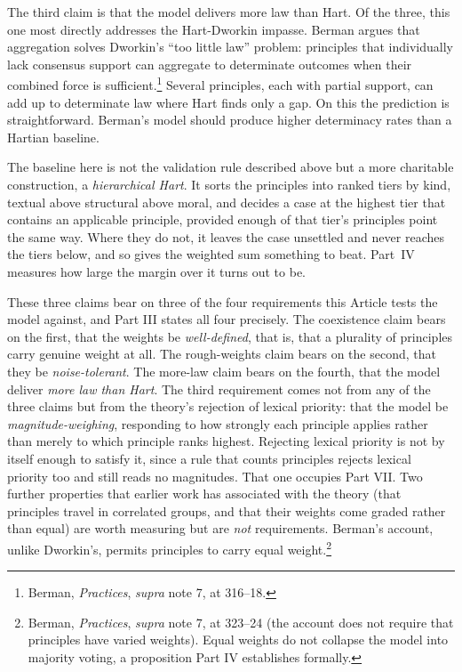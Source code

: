 The third claim is that the model delivers more law than Hart. Of the three, this one most directly addresses the Hart-Dworkin impasse. Berman
argues that aggregation solves Dworkin's ``too little law'' problem:
principles that individually lack consensus support can aggregate to
determinate outcomes when their combined force is sufficient.\footnote{Berman, \textit{Practices}, \textit{supra} note 7, at 316--18.} Several principles, each with partial
support, can add up to determinate law where Hart finds only a gap. On this the prediction is straightforward. Berman's model should produce
higher determinacy rates than a Hartian baseline.

The baseline here is not the validation rule described above but a more
charitable construction, a \textit{hierarchical Hart}. It sorts the
principles into ranked tiers by kind, textual above structural above moral,
and decides a case at the highest tier that contains an applicable principle,
provided enough of that tier's principles point the same way. Where they do
not, it leaves the case unsettled and never reaches the tiers below, and so
gives the weighted sum something to beat. Part~IV measures how large the
margin over it turns out to be.

These three claims bear on three of the four requirements this Article tests
the model against, and Part III states all four precisely. The
coexistence claim bears on the first, that the weights be
\textit{well-defined}, that is, that a plurality of principles carry
genuine weight at all. The rough-weights claim bears on the second, that they
be \textit{noise-tolerant}. The more-law claim bears on the fourth, that the
model deliver \textit{more law than Hart}. The third requirement comes not
from any of the three claims but from the theory's rejection of lexical
priority: that the model be \textit{magnitude-weighing}, responding to how
strongly each principle applies rather than merely to which principle ranks
highest. Rejecting lexical priority is not by itself enough to satisfy it,
since a rule that counts principles rejects lexical priority too and still
reads no magnitudes. That one occupies Part VII. Two further properties that earlier work has
associated with the theory (that principles travel in correlated groups,
and that their weights come graded rather than equal) are worth measuring
but are \textit{not} requirements. Berman's account, unlike Dworkin's,
permits principles to carry equal weight.\footnote{Berman, \textit{Practices}, \textit{supra} note 7, at 323--24 (the
account does not require that principles have varied weights). Equal
weights do not collapse the model into majority voting, a proposition Part
IV establishes formally.}


